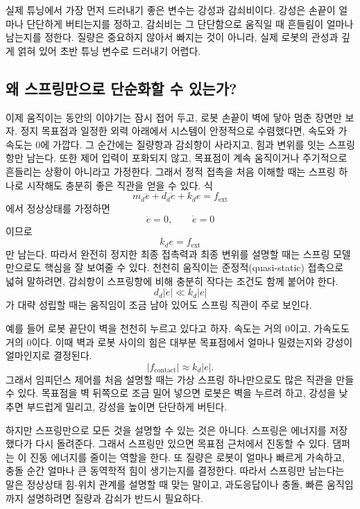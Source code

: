 실제 튜닝에서 가장 먼저 드러내기 좋은 변수는 강성과 감쇠비이다.
강성은 손끝이 얼마나 단단하게 버티는지를 정하고, 감쇠비는 그 단단함으로 움직일 때 흔들림이 얼마나 남는지를 정한다.
질량은 중요하지 않아서 빠지는 것이 아니라, 실제 로봇의 관성과 깊게 얽혀 있어 초반 튜닝 변수로 드러내기 어렵다.

\subsection{왜 스프링만으로 단순화할 수 있는가?}

이제 움직이는 동안의 이야기는 잠시 접어 두고, 로봇 손끝이 벽에 닿아 멈춘 장면만 보자.
정지 목표점과 일정한 외력 아래에서 시스템이 안정적으로 수렴했다면, 속도와 가속도는 0에 가깝다.
그 순간에는 질량항과 감쇠항이 사라지고, 힘과 변위를 잇는 스프링 항만 남는다.
또한 제어 입력이 포화되지 않고, 목표점이 계속 움직이거나 주기적으로 흔들리는 상황이 아니라고 가정한다.
그래서 정적 접촉을 처음 이해할 때는 스프링 하나로 시작해도 충분히 좋은 직관을 얻을 수 있다.
식
\begin{equation}
  m_d\ddot{e}+d_d\dot{e}+k_d e=f_{\mathrm{ext}}
\end{equation}
에서 정상상태를 가정하면
\begin{equation}
  \ddot{e}=0, \qquad \dot{e}=0
\end{equation}
이므로
\begin{equation}
  k_d e=f_{\mathrm{ext}}
\end{equation}
만 남는다.
따라서 완전히 정지한 최종 접촉력과 최종 변위를 설명할 때는 스프링 모델만으로도 핵심을 잘 보여줄 수 있다.
천천히 움직이는 준정적(quasi-static) 접촉으로 넓혀 말하려면, 감쇠항이 스프링항에 비해 충분히 작다는 조건도 함께 붙어야 한다.
\begin{equation}
  d_d|\dot{e}| \ll k_d|e|
\end{equation}
가 대략 성립할 때는 움직임이 조금 남아 있어도 스프링 직관이 주로 보인다.

예를 들어 로봇 끝단이 벽을 천천히 누르고 있다고 하자.
속도는 거의 0이고, 가속도도 거의 0이다.
이때 벽과 로봇 사이의 힘은 대부분 목표점에서 얼마나 밀렸는지와 강성이 얼마인지로 결정된다.
\begin{equation}
  |f_{\mathrm{contact}}| \approx k_d |e|.
\end{equation}
그래서 임피던스 제어를 처음 설명할 때는 가상 스프링 하나만으로도 많은 직관을 만들 수 있다.
목표점을 벽 뒤쪽으로 조금 밀어 넣으면 로봇은 벽을 누르려 하고, 강성을 낮추면 부드럽게 밀리고, 강성을 높이면 단단하게 버틴다.

하지만 스프링만으로 모든 것을 설명할 수 있는 것은 아니다.
스프링은 에너지를 저장했다가 다시 돌려준다.
그래서 스프링만 있으면 목표점 근처에서 진동할 수 있다.
댐퍼는 이 진동 에너지를 줄이는 역할을 한다.
또 질량은 로봇이 얼마나 빠르게 가속하고, 충돌 순간 얼마나 큰 동역학적 힘이 생기는지를 결정한다.
따라서 스프링만 남는다는 말은 정상상태 힘-위치 관계를 설명할 때 맞는 말이고, 과도응답이나 충돌, 빠른 움직임까지 설명하려면 질량과 감쇠가 반드시 필요하다.


